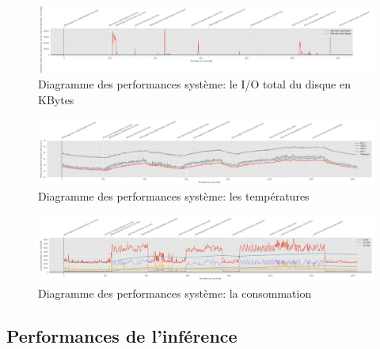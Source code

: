 {\begin{landscape}
\begin{figure}[H]
      \label{fig:io_segnetcamera}
   \end{figure} 
   \begin{figure}[H]
      \centering
      \includegraphics[width=1.5\textwidth]{io_totaldisk}
      \caption{Diagramme des performances système: le I/O total du disque en KBytes}
      \label{fig:io_totaldisk}
   \end{figure} 
   \begin{figure}[H]
      \centering
      \includegraphics[width=1.5\textwidth]{temperature}
      \caption[Diagramme des performances système: les températures]{Diagramme des performances système: les températures\protect\footnotemark}
      \label{fig:temperature}
   \end{figure} 
   \begin{figure}[H]
      \centering
      \includegraphics[width=1.5\textwidth]{consommation}
      \caption{Diagramme des performances système: la consommation}
      \label{fig:consommation}
   \end{figure}
   \end{landscape}
   \clearpage
   \newpage
}
\subsection{Performances de l'inférence}
